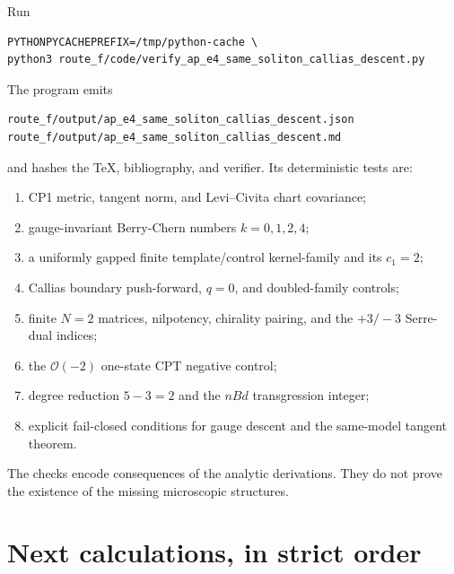 \documentclass[11pt]{article}
\theoremstyle{definition}
\theoremstyle{remark}
\newcommand{\cO}{\mathcal O}
\begin{document}
Run
\begin{verbatim}
PYTHONPYCACHEPREFIX=/tmp/python-cache \
python3 route_f/code/verify_ap_e4_same_soliton_callias_descent.py
\end{verbatim}
The program emits
\begin{verbatim}
route_f/output/ap_e4_same_soliton_callias_descent.json
route_f/output/ap_e4_same_soliton_callias_descent.md
\end{verbatim}
and hashes the TeX, bibliography, and verifier.  Its deterministic tests are:
\begin{enumerate}
\item CP1 metric, tangent norm, and Levi--Civita chart covariance;
\item gauge-invariant Berry-Chern numbers \(k=0,1,2,4\);
\item a uniformly gapped finite template/control kernel-family and its \(c_1=2\);
\item Callias boundary push-forward, \(q=0\), and doubled-family controls;
\item finite \(N=2\) matrices, nilpotency, chirality pairing, and the
  \(+3/-3\) Serre-dual indices;
\item the \(\cO(-2)\) one-state CPT negative control;
\item degree reduction \(5-3=2\) and the \(nBd\) transgression integer;
\item explicit fail-closed conditions for gauge descent and the same-model
  tangent theorem.
\end{enumerate}
The checks encode consequences of the analytic derivations.  They do not
prove the existence of the missing microscopic structures.

\section{Next calculations, in strict order}
\end{document}
